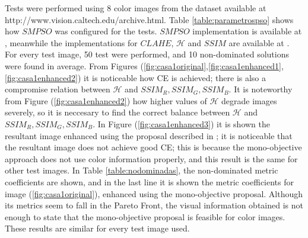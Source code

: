 \documentclass[11pt]{article}
\begin{document}
Tests were performed using 8 color images from the dataset available at http://www.vision.caltech.edu/archive.html. Table \ref{table:parametrospso} shows how $SMPSO$ was configured for the tests. $SMPSO$ implementation is available at \cite{durillo2010jmetal}, meanwhile the implementations for $CLAHE$, $\mathscr{H}$ and $SSIM$ are available at \cite{bradski2000opencv}. For every test image, 50 test were performed, and 10 non-dominated solutions were found in average. From Figures (\ref{fig:casa1original},\ref{fig:casa1enhanced1},\ref{fig:casa1enhanced2}) it is noticeable how CE is achieved; there is also a compromise relation between $\mathscr{H}$ and $SSIM_R,SSIM_G,SSIM_B$. It is noteworthy from Figure (\ref{fig:casa1enhanced2}) how higher values of $\mathscr{H}$ degrade images severely, so it is neccesary to find the correct balance between $\mathscr{H}$ and $SSIM_R,SSIM_G,SSIM_B$. In Figure (\ref{fig:casa1enhanced3}) it is shown the resultant image enhanced using the proposal described in \cite{morepso}; it is noticeable that the resultant image does not achieve good CE; this is because the mono-objective approach does not use color information properly, and this result is the same for other test images. In Table \ref{table:nodominadas}, the non-dominated metric coefficients are shown, and in the last line it is shown the metric coefficients for image (\ref{fig:casa1original}), enhanced using the mono-objective proposal. Although its metrics seem to fall in the Pareto Front, the visual information obtained is not enough to state that the mono-objective proposal is feasible for color images. These results are similar for every test image used.




\end{document}
